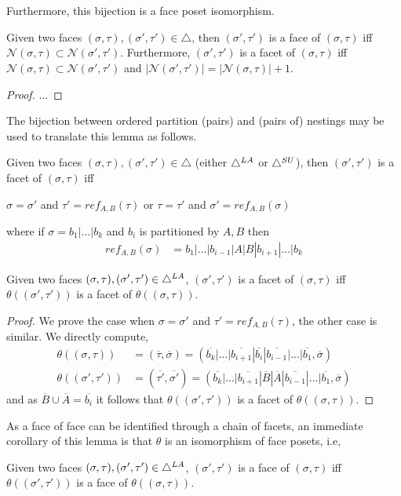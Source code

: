 \\\\
Furthermore, this bijection is a face poset isomorphism.  
\begin{lemma}
Given two faces $(\sigma,\tau),(\sigma',\tau') \in \triangle$, then $(\sigma',\tau')$ is a face of $(\sigma,\tau) $ iff $\mathcal{N}(\sigma,\tau) \subset \mathcal{N}(\sigma',\tau')$. Furthermore, $(\sigma',\tau')$ is a facet of $(\sigma,\tau) $ iff $\mathcal{N}(\sigma,\tau) \subset \mathcal{N}(\sigma',\tau')$ and $|\mathcal{N}(\sigma',\tau')| = |\mathcal{N}(\sigma,\tau)|+1$.
\end{lemma}
\begin{proof}
...
\end{proof}
The bijection between ordered partition (pairs) and (pairs of) nestings may be used to translate this lemma as follows. 
\begin{corollary}
Given two faces $(\sigma,\tau),(\sigma',\tau') \in \triangle$ (either $\triangle^{LA}$ or $\triangle^{SU}$), then
$(\sigma',\tau')$ is a facet of $(\sigma,\tau)$ iff 
\begin{center}
$\sigma = \sigma'$ and $\tau' = ref_{A,B}(\tau)$ or $\tau = \tau'$ and $\sigma' = ref_{A,B}(\sigma)$
\end{center}
where if $\sigma = b_1|...|b_k$ and $b_i$ is partitioned by $A,B$ then
\begin{align*}
    ref_{A,B}(\sigma) &= b_1|...|b_{i-1}|A|B|b_{i+1}|...|b_k
\end{align*}
\end{corollary}

\begin{lemma}
Given two faces $(\sigma,\tau),(\sigma',\tau') \in \triangle^{LA}$,
$(\sigma',\tau')$ is a facet of $(\sigma,\tau)$ iff $\theta((\sigma',\tau'))$ is a facet of $\theta((\sigma,\tau))$.
\end{lemma}
\begin{proof}
We prove the case when $\sigma = \sigma'$ and $\tau' = ref_{A,B}(\tau)$, the other case is similar. We directly compute,
\begin{align*}
    \theta( (\sigma,\tau)) &= (\overline{\tau},\overline{\sigma}) = (\overline{b_k}|...|\overline{b_{i+1}}|\overline{b_i}|\overline{b_{i-1}}|...|\overline{b_1},\overline{\sigma})\\
    \theta( (\sigma',\tau')) &= (\overline{\tau'},\overline{\sigma'}) = (\overline{b_k}|...|\overline{b_{i+1}}|\overline{B}|\overline{A}|\overline{b_{i-1}}|...|\overline{b_1},\overline{\sigma})
\end{align*}
and as $\overline{B}\cup\overline{A}=\overline{b_i}$ it follows that $\theta((\sigma',\tau'))$ is a facet of $\theta((\sigma,\tau))$.
\end{proof}
As a face of face can be identified through a chain of facets, an immediate corollary of this lemma is that $\theta$ is an isomorphism of face posets, i.e,
\begin{corollary}
Given two faces $(\sigma,\tau),(\sigma',\tau') \in \triangle^{LA}$,
$(\sigma',\tau')$ is a face of $(\sigma,\tau)$ iff $\theta((\sigma',\tau'))$ is a face of $\theta((\sigma,\tau))$. 
\end{corollary}

